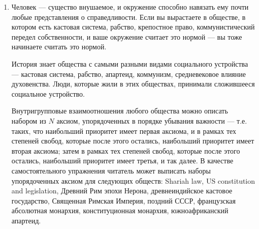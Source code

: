 \documentclass[11pt]{article}
\theoremstyle{remark}
\theoremstyle{definition}
\begin{document}
\begin{enumerate}
\item Человек --- существо внушаемое, и окружение способно навязать ему почти любые представления о справедливости. Если вы вырастаете в обществе, в котором есть кастовая система, рабство, крепостное право, коммунистический передел собственности, и ваше окружение считает это нормой --- вы тоже начинаете считать это нормой. 

История знает общества с самыми разными видами социального устройства --- кастовая система, рабство, апартеид, коммунизм, средневековое влияние духовенства. Люди, которые жили в этих обществах, принимали сложившееся социальное устройство.



Внутригрупповые взаимоотношения любого общества можно описать набором из $N$ аксиом, упорядоченных в порядке убывания важности --- т.е. таких, что наибольший приоритет имеет первая аксиома, и в рамках тех степеней свобод, которые после этого остались, наибольший приоритет имеет вторая аксиома; затем в рамках тех степеней свобод, которые после этого остались, наибольший приоритет имеет третья, и так далее. В качестве самостоятельного упражнения читатель может выписать наборы упорядоченных аксиом для следующих обществ: Shariah law, US constitution and legislation, Древний Рим эпохи Нерона, древнеиндийское кастовое государство, Священная Римская Империя, поздний СССР, французская абсолютная монархия, конституционная монархия, южноафриканский апартеид.


\end{enumerate}
\end{document}
